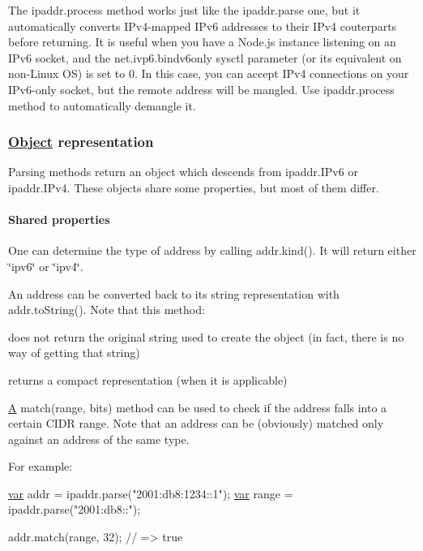 The {\ttfamily ipaddr.\+process} method works just like the {\ttfamily ipaddr.\+parse} one, but it automatically converts I\+Pv4-\/mapped I\+Pv6 addresses to their I\+Pv4 couterparts before returning. It is useful when you have a Node.\+js instance listening on an I\+Pv6 socket, and the {\ttfamily net.\+ivp6.\+bindv6only} sysctl parameter (or its equivalent on non-\/\+Linux O\+S) is set to 0. In this case, you can accept I\+Pv4 connections on your I\+Pv6-\/only socket, but the remote address will be mangled. Use {\ttfamily ipaddr.\+process} method to automatically demangle it.

\subsubsection*{\hyperlink{struct_object}{Object} representation}

Parsing methods return an object which descends from {\ttfamily ipaddr.\+I\+Pv6} or {\ttfamily ipaddr.\+I\+Pv4}. These objects share some properties, but most of them differ.

\paragraph*{Shared properties}

One can determine the type of address by calling {\ttfamily addr.\+kind()}. It will return either {\ttfamily \char`\"{}ipv6\char`\"{}} or {\ttfamily \char`\"{}ipv4\char`\"{}}.

An address can be converted back to its string representation with {\ttfamily addr.\+to\+String()}. Note that this method\+:
\begin{DoxyItemize}
\item does not return the original string used to create the object (in fact, there is no way of getting that string)
\item returns a compact representation (when it is applicable)
\end{DoxyItemize}

\hyperlink{class_a}{A} {\ttfamily match(range, bits)} method can be used to check if the address falls into a certain C\+I\+D\+R range. Note that an address can be (obviously) matched only against an address of the same type.

For example\+:


\begin{DoxyCode}
\hyperlink{018__def_8c_a335628f2e9085305224b4f9cc6e95ed5}{var} addr = ipaddr.parse(\textcolor{stringliteral}{"2001:db8:1234::1"});
\hyperlink{018__def_8c_a335628f2e9085305224b4f9cc6e95ed5}{var} range = ipaddr.parse(\textcolor{stringliteral}{"2001:db8::"});

addr.match(range, 32); \textcolor{comment}{// => true}
\end{DoxyCode}


